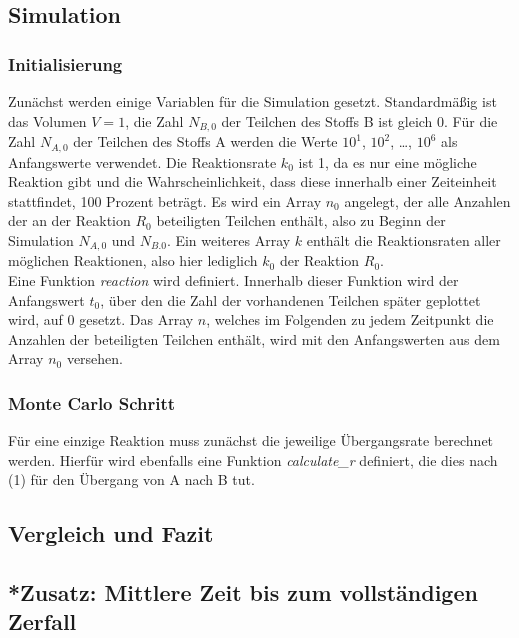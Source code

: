 \documentclass{scrartcl}
\begin{document}
\subsection{Simulation} 
\subsubsection{Initialisierung}
Zunächst werden einige Variablen für die Simulation gesetzt. Standardmäßig ist das Volumen $V = 1$, die Zahl $N_{B, 0}$ der Teilchen des Stoffs B ist gleich 0. Für die Zahl $N_{A, 0}$ der Teilchen des Stoffs A werden die Werte $10^1$, $10^2$, \dots, $10^6$ als Anfangswerte verwendet. Die Reaktionsrate $k_0$ ist 1, da es nur eine mögliche Reaktion gibt und die Wahrscheinlichkeit, dass diese innerhalb einer Zeiteinheit stattfindet, 100 Prozent beträgt. Es wird ein Array $n_0$ angelegt, der alle Anzahlen der an der Reaktion $R_0$ beteiligten Teilchen enthält, also zu Beginn der Simulation $N_{A, 0}$ und $N_{B. 0}$. Ein weiteres Array $k$ enthält die Reaktionsraten aller möglichen Reaktionen, also hier lediglich $k_0$ der Reaktion $R_0$. \\
Eine Funktion \textit{reaction} wird definiert. Innerhalb dieser Funktion wird der Anfangswert $t_0$, über den die Zahl der vorhandenen Teilchen später geplottet wird, auf 0 gesetzt. Das Array $n$, welches im Folgenden zu jedem Zeitpunkt die Anzahlen der beteiligten Teilchen enthält, wird mit den Anfangswerten aus dem Array $n_0$ versehen.

\subsubsection{Monte Carlo Schritt}
Für eine einzige Reaktion muss zunächst die jeweilige Übergangsrate berechnet werden. Hierfür wird ebenfalls eine Funktion \textit{calculate\_r} definiert, die dies nach (1) für den Übergang von A nach B tut. %

\subsection{Vergleich und Fazit}
\subsection{*Zusatz: Mittlere Zeit bis zum vollständigen Zerfall}
\end{document}
